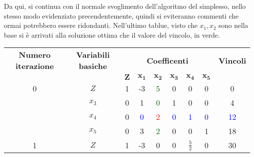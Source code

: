 \documentclass{article}
\begin{document}
Da qui, si continua con il normale svoglimento dell'algoritmo del simplesso, nello stesso modo evidenziato precendentemente, quindi si eviteranno commenti che ormai potrebbero essere ridondanti. Nell'ultimo tablue, visto che $x_1, x_2$ sono nella base si è arrivati alla soluzione ottima che il valore del vincolo, in verde.

\begin{table}[h]
  \centering
  \begin{tabular}{|c|c|c|c|c|c|c|c|c|}
    \hline
    {\textbf{Numero iterazione}} & {\textbf{Variabili basiche}} & \multicolumn{6}{|c|}{\textbf{Coefficenti}} & \textbf{Vincoli}                                                                                                                                 \\
    \cline{1-8}
                                 &                              & $\mathbf{Z}$                               & $\mathbf{x_1}$           & $\mathbf{x_2}$           & $\mathbf{x_3}$      & $\mathbf{x_4}$      & $\mathbf{x_5}$      &                          \\
    \hline
    0                            & $Z$                          & 1                                          & -3                       & \textcolor{darkgreen}{5} & 0                   & 0                   & 0                   & 0                        \\
                                 & $x_3$                        & 0                                          & 1                        & \textcolor{darkgreen}{0} & 1                   & 0                   & 0                   & 4                        \\
                                 & $x_4$                        & 0                                          & \textcolor{blue}{0}      & \textcolor{red}{2}       & \textcolor{blue}{0} & \textcolor{blue}{1} & \textcolor{blue}{0} & \textcolor{blue}{12}     \\
                                 & $x_5$                        & 0                                          & 3                        & \textcolor{darkgreen}{2} & 0                   & 0                   & 1                   & 18                       \\
    \hline
    1                            & $Z$                          & 1                                          & -3                       & 0                        & 0                   & $\frac{5}{2}$       & 0                   & 30                       \\

\end{tabular}
\end{table}
\end{document}
